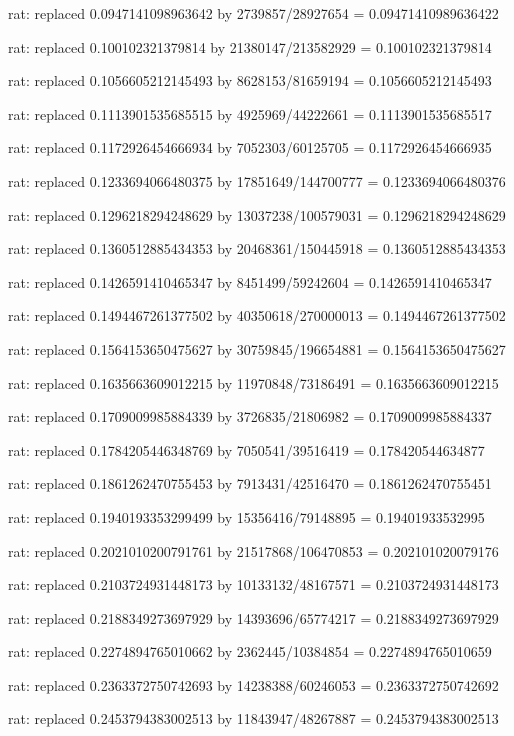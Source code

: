\documentclass[a4paper,10pt]{article}
\begin{document}
\begin{eulernotebook}
\begin{eulercomment}
\begin{eulercomment}
\begin{eulercomment}
\begin{eulercomment}
\begin{eulercomment}
\begin{eulercomment}
\begin{eulercomment}
\begin{eulercomment}
\begin{eulercomment}
\begin{eulercomment}
\begin{eulercomment}
\begin{eulercomment}
\begin{eulercomment}
\begin{eulercomment}
\begin{eulercomment}
\begin{eulercomment}
\begin{euleroutput}
  rat: replaced 0.0947141098963642 by 2739857/28927654 = 0.09471410989636422
  
  rat: replaced 0.100102321379814 by 21380147/213582929 = 0.100102321379814
  
  rat: replaced 0.1056605212145493 by 8628153/81659194 = 0.1056605212145493
  
  rat: replaced 0.1113901535685515 by 4925969/44222661 = 0.1113901535685517
  
  rat: replaced 0.1172926454666934 by 7052303/60125705 = 0.1172926454666935
  
  rat: replaced 0.1233694066480375 by 17851649/144700777 = 0.1233694066480376
  
  rat: replaced 0.1296218294248629 by 13037238/100579031 = 0.1296218294248629
  
  rat: replaced 0.1360512885434353 by 20468361/150445918 = 0.1360512885434353
  
  rat: replaced 0.1426591410465347 by 8451499/59242604 = 0.1426591410465347
  
  rat: replaced 0.1494467261377502 by 40350618/270000013 = 0.1494467261377502
  
  rat: replaced 0.1564153650475627 by 30759845/196654881 = 0.1564153650475627
  
  rat: replaced 0.1635663609012215 by 11970848/73186491 = 0.1635663609012215
  
  rat: replaced 0.1709009985884339 by 3726835/21806982 = 0.1709009985884337
  
  rat: replaced 0.1784205446348769 by 7050541/39516419 = 0.178420544634877
  
  rat: replaced 0.1861262470755453 by 7913431/42516470 = 0.1861262470755451
  
  rat: replaced 0.1940193353299499 by 15356416/79148895 = 0.19401933532995
  
  rat: replaced 0.2021010200791761 by 21517868/106470853 = 0.202101020079176
  
  rat: replaced 0.2103724931448173 by 10133132/48167571 = 0.2103724931448173
  
  rat: replaced 0.2188349273697929 by 14393696/65774217 = 0.2188349273697929
  
  rat: replaced 0.2274894765010662 by 2362445/10384854 = 0.2274894765010659
  
  rat: replaced 0.2363372750742693 by 14238388/60246053 = 0.2363372750742692
  
  rat: replaced 0.2453794383002513 by 11843947/48267887 = 0.2453794383002513
  

\end{euleroutput}
\end{eulercomment}
\end{eulercomment}
\end{eulercomment}
\end{eulercomment}
\end{eulercomment}
\end{eulercomment}
\end{eulercomment}
\end{eulercomment}
\end{eulercomment}
\end{eulercomment}
\end{eulercomment}
\end{eulercomment}
\end{eulercomment}
\end{eulercomment}
\end{eulercomment}
\end{eulercomment}
\end{eulernotebook}
\end{document}
